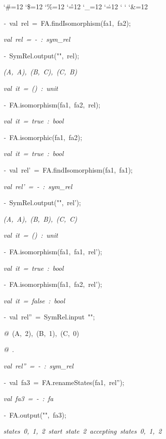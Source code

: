 \begin{list}{}
{\setlength{\leftmargin}{\leftmargini}
\setlength{\rightmargin}{0cm}
\setlength{\itemindent}{0cm}
\setlength{\listparindent}{0cm}
\setlength{\itemsep}{0cm}
\setlength{\parsep}{0cm}
\setlength{\labelsep}{0cm}
\setlength{\labelwidth}{0cm}
\catcode`\#=12
\catcode`\$=12
\catcode`\%=12
\catcode`\^=12
\catcode`\_=12
\catcode`\.=12
\catcode`
\catcode`
\catcode`\&=12
\ttfamily}
\small
\item[]\textsl{-\ }val\ rel\ =\ FA.findIsomorphism(fa1,\ fa2);
\item[]\textsl{val\ rel\ =\ -\ :\ sym_rel}
\item[]\textsl{-\ }SymRel.output("",\ rel);
\item[]\textsl{(A,\ A),\ (B,\ C),\ (C,\ B)}
\item[]\textsl{val\ it\ =\ ()\ :\ unit}
\item[]\textsl{-\ }FA.isomorphism(fa1,\ fa2,\ rel);
\item[]\textsl{val\ it\ =\ true\ :\ bool}
\item[]\textsl{-\ }FA.isomorphic(fa1,\ fa2);
\item[]\textsl{val\ it\ =\ true\ :\ bool}
\item[]\textsl{-\ }val\ rel'\ =\ FA.findIsomorphism(fa1,\ fa1);
\item[]\textsl{val\ rel'\ =\ -\ :\ sym_rel}
\item[]\textsl{-\ }SymRel.output("",\ rel');
\item[]\textsl{(A,\ A),\ (B,\ B),\ (C,\ C)}
\item[]\textsl{val\ it\ =\ ()\ :\ unit}
\item[]\textsl{-\ }FA.isomorphism(fa1,\ fa1,\ rel');
\item[]\textsl{val\ it\ =\ true\ :\ bool}
\item[]\textsl{-\ }FA.isomorphism(fa1,\ fa2,\ rel');
\item[]\textsl{val\ it\ =\ false\ :\ bool}
\item[]\textsl{-\ }val\ rel''\ =\ SymRel.input\ "";
\item[]\textsl{@\ }(A,\ 2),\ (B,\ 1),\ (C,\ 0)
\item[]\textsl{@\ }.
\item[]\textsl{val\ rel''\ =\ -\ :\ sym_rel}
\item[]\textsl{-\ }val\ fa3\ =\ FA.renameStates(fa1,\ rel'');
\item[]\textsl{val\ fa3\ =\ -\ :\ fa}
\item[]\textsl{-\ }FA.output("",\ fa3);
\item[]\textsl{states\ 0,\ 1,\ 2\ start\ state\ 2\ accepting\ states\ 0,\ 1,\ 2}

\end{list}
